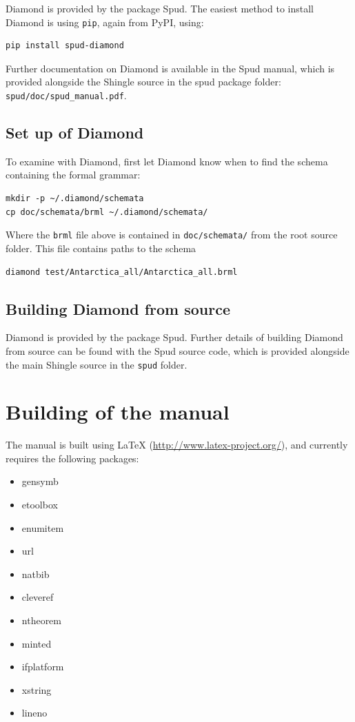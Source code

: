 \documentclass[a4paper, 10pt]{book}
\providecommand{\shingle}{Shingle\xspace}
\begin{document}
\noindent
Diamond is provided by the package Spud.
The easiest method to install Diamond is using \verb+pip+, again from PyPI, using:
\begin{verbatim}
pip install spud-diamond 
\end{verbatim}
Further documentation on Diamond is available in the Spud manual,
which is provided alongside the \shingle source in the spud package folder: \verb+spud/doc/spud_manual.pdf+.

\subsection{Set up of Diamond}

\noindent
To examine with Diamond, first let Diamond know when to find the schema containing the formal grammar:
\begin{verbatim}
mkdir -p ~/.diamond/schemata
cp doc/schemata/brml ~/.diamond/schemata/ 
\end{verbatim}

\noindent
Where the \verb+brml+ file above is contained in \verb+doc/schemata/+ from the root source folder.  This file contains paths to the schema
\begin{verbatim}
diamond test/Antarctica_all/Antarctica_all.brml
\end{verbatim}

\subsection{Building Diamond from source}

\noindent
Diamond is provided by the package Spud.
Further details of building Diamond from source can be found with the Spud source code,
which is provided alongside the main \shingle source in the \verb+spud+ folder.



\section{Building of the manual}

\noindent
The manual is built using LaTeX (\url{http://www.latex-project.org/}), and currently requires the following packages:
\begin{itemize}
\item gensymb
\item etoolbox
\item enumitem
\item url
\item natbib
\item cleveref
\item ntheorem
\item minted
\item ifplatform
\item xstring
\item lineno
\end{itemize}
\end{document}
